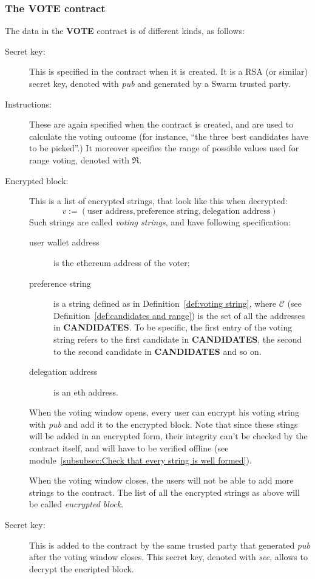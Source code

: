 \documentclass[submission, copyright,creativecommons,sharealike,noncommercial]{eptcs}
\newcommand{\candidates}{\ensuremath{\mathcal{C}} \xspace}
\newcommand{\range}{\ensuremath{\mathfrak{R}}\xspace}
\newcommand{\Candidates}{\textbf{CANDIDATES}\xspace}
\newcommand{\Vote}{\textbf{VOTE}\xspace}
\begin{document}
\subsubsection{The \Vote contract}
	The data in the \Vote contract is of different kinds, as follows:
	\begin{description}
		\item[Secret key:] This is specified in the contract when it is created. It is a RSA (or similar) secret key, denoted with \emph{pub} and generated by a Swarm trusted party.
			
		\item[Instructions:] These are again specified when the contract is created, and are used to calculate the voting outcome (for instance, ``the three best candidates have to be picked''.) It moreover specifies the range of possible values used for range voting, denoted with $\range$.
		\item[Encrypted block:] This is a list of encrypted strings, that look like this when decrypted:
		\[
		v := (\text{user address}, \text{preference string}, \text{delegation address})
		\]
		Such strings are called \emph{voting strings}, and have following specification:
		\begin{description}
			\item[user wallet address] is the ethereum address of the voter;
			\item[preference string] is a string defined as in Definition~\ref{def:voting string}, where $\candidates$ (see Definition~\ref{def:candidates and range}) is the set of all the addresses in \Candidates. To be specific, the first entry of the voting string refers to the first candidate in \Candidates, the second to the second candidate in \Candidates and so on.
			\item[delegation address] is an eth address.
		\end{description}
		When the voting window opens, every user can encrypt his voting string with \emph{pub} and add it to the encrypted block.
		Note that since these stings will be added in an encrypted form, their integrity can't be checked by the contract itself, and will have to be verified offline (see module~\ref{subsubsec:Check that every string is well formed}).
		
		When the voting window closes, the users will not be able to add more strings to the contract. The list of all the encrypted strings as above will be called \emph{encrypted block}.
		
		\item[Secret key:] This is added to the contract by the same trusted party that generated \emph{pub} after the voting window closes. This secret key, denoted with \emph{sec}, allows to decrypt the encripted block.
		

\end{description}
\end{document}
